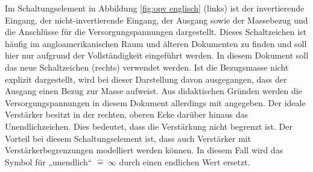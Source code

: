 {\begin{frame}
    Im Schaltungselement in Abbildung \ref{fig:opv englisch} (links) ist der invertierende Eingang, der 
    nicht-invertierende Eingang, der Ausgang sowie der Massebezug und die 
    Anschlüsse für die Versorgungspannungen dargestellt. Dieses Schaltzeichen ist 
    häufig im angloamerikanischen Raum und älteren Dokumenten zu finden und soll hier 
    nur aufgrund der Vollständigkeit eingeführt werden. 
    In diesem Dokument soll das neue Schaltzeichen (rechts) verwendet werden. Ist die Bezugsmasse nicht explizit dargestellt, wird bei dieser Darstellung davon ausgegangen, dass 
    der Ausgang einen Bezug zur Masse aufweist. 
    Aus didaktischen Gründen werden die Versorgungspannungen in diesem Dokument allerdings mit angegeben. Der ideale Verstärker besitzt in der rechten, 
    oberen Ecke darüber hinaus das Unendlichzeichen. Dies bedeutet, dass die Verstärkung nicht 
    begrenzt ist. Der Vorteil bei diesem Schaltungselement ist, dass auch Verstärker mit Verstärkerbegrenzungen 
    modelliert werden können. In diesem Fall wird das Symbol für „unendlich“ $\widehat{=}~\infty$ durch einen endlichen Wert ersetzt.




    \begin{figure}[ht]
        \centering
    \end{figure}
\end{frame}}
